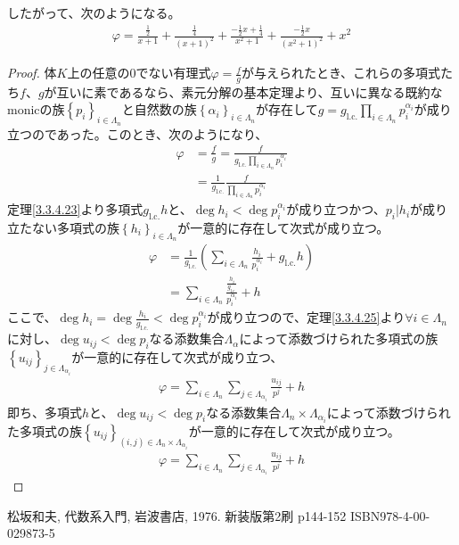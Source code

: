 \documentclass[dvipdfmx]{jsarticle}
\begin{document}
したがって、次のようになる。
\begin{align*}
\varphi = \frac{\frac{1}{2}}{x + 1} + \frac{\frac{1}{4}}{(x + 1)^{2}} + \frac{- \frac{1}{2}x + \frac{1}{4}}{x^{2} + 1} + \frac{- \frac{1}{2}x}{\left( x^{2} + 1 \right)^{2}} + x^{2}
\end{align*}
\begin{proof}
体$K$上の任意の$0$でない有理式$\varphi = \frac{f}{g}$が与えられたとき、これらの多項式たち$f$、$g$が互いに素であるなら、素元分解の基本定理より、互いに異なる既約なmonicの族$\left\{ p_{i} \right\}_{i \in \varLambda_{n}}$と自然数の族$\left\{ \alpha_{i} \right\}_{i \in \varLambda_{n}}$が存在して$g = {g}_{\mathrm{l.c.}}\prod_{i \in \varLambda_{n}} p_{i}^{\alpha_{i}}$が成り立つのであった。このとき、次のようになり、
\begin{align*}
\varphi &= \frac{f}{g} = \frac{f}{{g}_{\mathrm{l.c.}}\prod_{i \in \varLambda_{n}} p_{i}^{\alpha_{i}}}\\
&= \frac{1}{{g}_{\mathrm{l.c.}}}\frac{f}{\prod_{i \in \varLambda_{n}} p_{i}^{\alpha_{i}}}
\end{align*}
定理\ref{3.3.4.23}より多項式${g}_{\mathrm{l.c.}}h$と、$\deg h_{i} < \deg p_{i}^{\alpha_{i}}$が成り立つかつ、$p_{i}|h_{i}$が成り立たない多項式の族$\left\{ h_{i} \right\}_{i \in \varLambda_{n}}$が一意的に存在して次式が成り立つ。
\begin{align*}
\varphi &= \frac{1}{{g}_{\mathrm{l.c.}}}\left( \sum_{i \in \varLambda_{n}} \frac{h_{i}}{p_{i}^{\alpha_{i}}} + {g}_{\mathrm{l.c.}}h \right)\\
&= \sum_{i \in \varLambda_{n}} \frac{\frac{h_{i}}{{g}_{\mathrm{l.c.}}}}{p_{i}^{\alpha_{i}}} + h
\end{align*}
ここで、$\deg h_{i} = \deg\frac{h_{i}}{{g}_{\mathrm{l.c.}}} < \deg p_{i}^{\alpha_{i}}$が成り立つので、定理\ref{3.3.4.25}より$\forall i \in \varLambda_{n}$に対し、$\deg u_{ij} < \deg p_{i}$なる添数集合$\varLambda_{\alpha}$によって添数づけられた多項式の族$\left\{ u_{ij} \right\}_{j \in \varLambda_{\alpha_{i}}}$が一意的に存在して次式が成り立つ、
\begin{align*}
\varphi = \sum_{i \in \varLambda_{n}} {\sum_{j \in \varLambda_{\alpha_{i}}} \frac{u_{ij}}{p^{j}}} + h
\end{align*}
即ち、多項式$h$と、$\deg u_{ij} < \deg p_{i}$なる添数集合$\varLambda_{n} \times \varLambda_{\alpha_{i}}$によって添数づけられた多項式の族$\left\{ u_{ij} \right\}_{(i,j) \in \varLambda_{n} \times \varLambda_{\alpha_{i}}}$が一意的に存在して次式が成り立つ。
\begin{align*}
\varphi = \sum_{i \in \varLambda_{n}} {\sum_{j \in \varLambda_{\alpha_{i}}} \frac{u_{ij}}{p^{j}}} + h
\end{align*}
\end{proof}
\begin{thebibliography}{50}
  松坂和夫, 代数系入門, 岩波書店, 1976. 新装版第2刷 p144-152 ISBN978-4-00-029873-5
\end{thebibliography}
\end{document}
